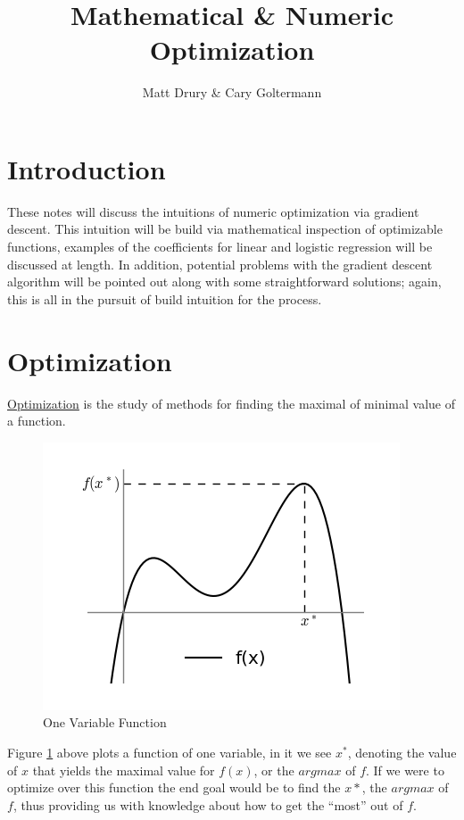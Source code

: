 \documentclass[a4paper, 12pt]{article}
\title{Mathematical \& Numeric Optimization}
\author{Matt Drury \& Cary Goltermann}
\begin{document}
\maketitle

\section*{Introduction}
    These notes will discuss the intuitions of numeric optimization via gradient descent. This intuition will be build via mathematical inspection of optimizable functions, examples of the coefficients for linear and logistic regression will be discussed at length. In addition, potential problems with the gradient descent algorithm will be pointed out along with some straightforward solutions; again, this is all in the pursuit of build intuition for the process.

\section*{Optimization}

\underline{Optimization} is the study of methods for finding the maximal of minimal value of a function.

\begin{figure}[H]
  \centering
    \includegraphics[scale=1]{images/one_var.png}
  \caption{One Variable Function} \label{fig:one}
\end{figure}

Figure \ref{fig:one} above plots a function of one variable, in it we see $x^*$, denoting the value of $x$ that yields the maximal value for $f(x)$, or the $argmax$ of $f$. If we were to optimize over this function the end goal would be to find the $x*$, the $argmax$ of $f$, thus providing us with knowledge about how to get the ``most'' out of $f$.
\end{document}
